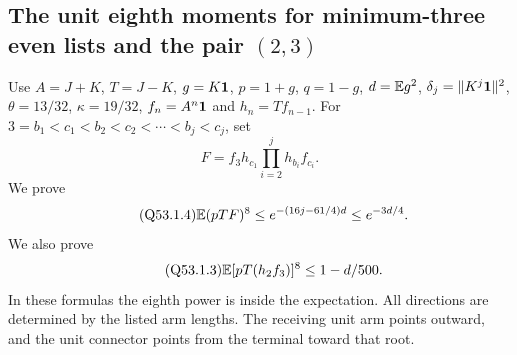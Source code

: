 \subsection{The unit eighth moments for minimum-three even lists and the pair $(2,\allowbreak 3)$}\label{proof:Q5-C053-unit}
Use $A=\allowbreak J+K$, $T=\allowbreak J-K$, $g=\allowbreak K\mathbf1$, $p=\allowbreak 1+g$, $q=\allowbreak 1-g$,
$d=\allowbreak \mathbb E g^2$, $\delta_j=\allowbreak \|K^j\mathbf1\|^2$, $\theta=\allowbreak 13/32$, $\kappa=\allowbreak 19/32$,
$f_n=\allowbreak A^n\mathbf1$ and $h_n=\allowbreak Tf_{n-1}$.
For $3=\allowbreak b_1<\allowbreak c_1<\allowbreak b_2<\allowbreak c_2<\allowbreak \cdots<\allowbreak b_j<\allowbreak c_j$, set
\[
 F=f_3h_{c_1}\prod_{i=2}^j h_{b_i}f_{c_i}.
\]
We prove
\begin{equation}\tag{Q53.1.4}\label{eq:Q53:minthree-unit}
 \mathbb E(pTF)^8\le e^{-(16j-61/4)d}\le e^{-3d/4}.
\end{equation}
We also prove
\begin{equation}\tag{Q53.1.3}\label{eq:Q53:twothree-unit}
 \mathbb E[pT(h_2f_3)]^8\le1-d/500.
\end{equation}
In these formulas the eighth power is inside the expectation. All directions
are determined by the listed arm lengths. The receiving unit arm points
outward, and the unit connector points from the terminal toward that root.

